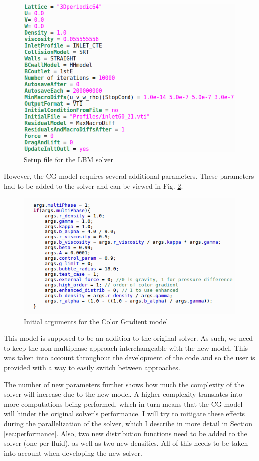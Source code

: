 \documentclass[12pt]{book}
\begin{document}
\begin{figure}[H]
	\centering
	\includegraphics[width=0.9\linewidth]{Resources/Images/setup.png}
	\caption{Setup file for the LBM solver}
	\label{fig:setupLBM}
\end{figure}
 However, the CG model requires several additional parameters. These parameters had to be added to the solver and can be viewed in Fig. \ref{fig:setupCG}.
\begin{figure}[H]
	\centering
	\includegraphics[width=0.9\linewidth]{Resources/Images/setupCG.png}
	\caption{Initial arguments for the Color Gradient model}
	\label{fig:setupCG}
\end{figure}

This model is supposed to be an addition to the original solver. As such, we need to keep the non-multiphase approach interchangeable with the new model. This was taken into account throughout the development of the code and so the user is provided with a way to easily switch between approaches. \par
The number of new parameters further shows how much the complexity of the solver will increase due to the new model. A higher complexity translates into more computations being performed, which in turn means that the CG model will hinder the original solver's performance. I will try to mitigate these effects during the parallelization of the solver, which I describe in more detail in Section \ref{sec:performance}. Also, two new distribution functions need to be added to the solver (one per fluid), as well as two new densities. All of this needs to be taken into account when developing the new solver.
\end{document}
